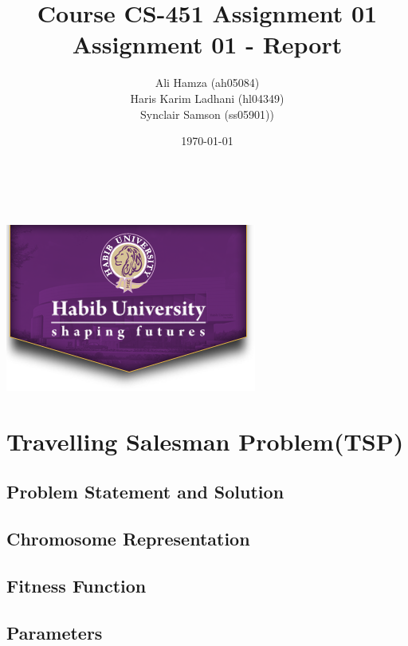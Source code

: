 \documentclass[11pt, letterpaper]{article}
\begin{document}
\title{\large Course CS-451 Assignment 01\\[0.5cm]
        \bf\Large Assignment 01 - Report}
\author{\large Ali Hamza (ah05084) \\ Haris Karim Ladhani (hl04349) \\ Synclair Samson (ss05901))}
\date{\today}
\makeatletter
    \begin{titlepage}
        \begin{center}
        \vbox{}\vspace{5cm}
            {\@title }\\[3cm] 
            {\@author}\\
            \vfill \includegraphics[scale=0.5]{images/logo.png}\\[1cm]
            {\@date}
        \end{center}
    \end{titlepage}
\makeatother

\newpage
\tableofcontents

\section{Travelling Salesman Problem(TSP)}
\subsection{Problem Statement and Solution}
\subsection{Chromosome Representation}

\subsection{Fitness Function}
\subsection{Parameters}
\end{document}
